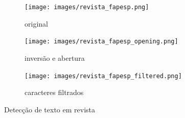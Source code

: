 \documentclass{article}
\begin{document}
\begin{figure}[H]
	\centering
	\begin{subfigure}{.45\textwidth}
		\texttt{[image: images/revista\_fapesp.png]}
		\caption{original}
		\label{fig:revista0}
	\end{subfigure}
	\begin{subfigure}{.45\textwidth}
		\texttt{[image: images/revista\_fapesp\_opening.png]}
		\caption{inversão e abertura}
		\label{fig:revista1}
	\end{subfigure}
	\begin{subfigure}{.9\textwidth}
		\texttt{[image: images/revista\_fapesp\_filtered.png]}
		\caption{caracteres filtrados}
		\label{fig:revista2}
	\end{subfigure}
	\caption{Detecção de texto em revista}
	\label{fig:revista}
\end{figure}
\end{document}
